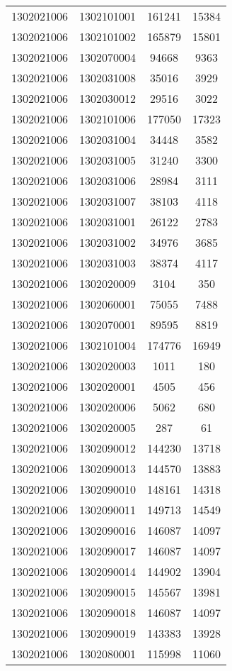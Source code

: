\begin{longtable}[h]{llcc}
		1302021006 & 1302101001 & 161241 & 15384\\
		1302021006 & 1302101002 & 165879 & 15801\\
		1302021006 & 1302070004 & 94668 & 9363\\
		1302021006 & 1302031008 & 35016 & 3929\\
		1302021006 & 1302030012 & 29516 & 3022\\
		1302021006 & 1302101006 & 177050 & 17323\\
		1302021006 & 1302031004 & 34448 & 3582\\
		1302021006 & 1302031005 & 31240 & 3300\\
		1302021006 & 1302031006 & 28984 & 3111\\
		1302021006 & 1302031007 & 38103 & 4118\\
		1302021006 & 1302031001 & 26122 & 2783\\
		1302021006 & 1302031002 & 34976 & 3685\\
		1302021006 & 1302031003 & 38374 & 4117\\
		1302021006 & 1302020009 & 3104 & 350\\
		1302021006 & 1302060001 & 75055 & 7488\\
		1302021006 & 1302070001 & 89595 & 8819\\
		1302021006 & 1302101004 & 174776 & 16949\\
		1302021006 & 1302020003 & 1011 & 180\\
		1302021006 & 1302020001 & 4505 & 456\\
		1302021006 & 1302020006 & 5062 & 680\\
		1302021006 & 1302020005 & 287 & 61\\
		1302021006 & 1302090012 & 144230 & 13718\\
		1302021006 & 1302090013 & 144570 & 13883\\
		1302021006 & 1302090010 & 148161 & 14318\\
		1302021006 & 1302090011 & 149713 & 14549\\
		1302021006 & 1302090016 & 146087 & 14097\\
		1302021006 & 1302090017 & 146087 & 14097\\
		1302021006 & 1302090014 & 144902 & 13904\\
		1302021006 & 1302090015 & 145567 & 13981\\
		1302021006 & 1302090018 & 146087 & 14097\\
		1302021006 & 1302090019 & 143383 & 13928\\
		1302021006 & 1302080001 & 115998 & 11060\\

\end{longtable}
